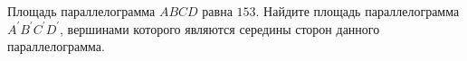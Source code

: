 \begin{ex}
	\begin{condition}
		 Площадь параллелограмма \(ABCD\) равна \(153\). Найдите площадь параллелограмма \( A^{'} B^{'} C^{'} D^{'} \), вершинами которого являются середины сторон данного параллелограмма.
	\end{condition}
\end{ex}
